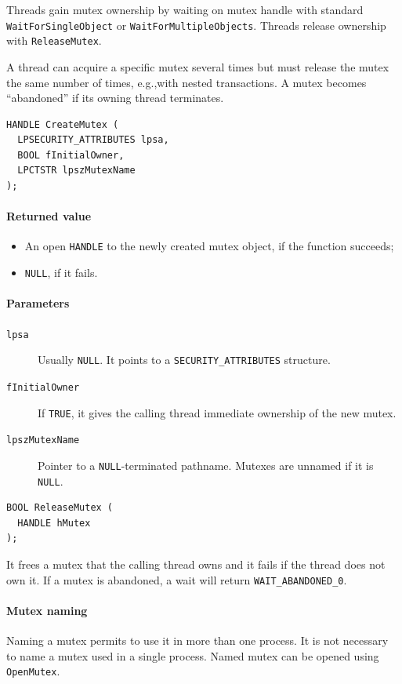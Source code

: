 Threads gain mutex ownership by waiting on mutex handle with standard \texttt{WaitForSingleObject} or \texttt{WaitForMultipleObjects}. Threads release ownership with \texttt{ReleaseMutex}.

A thread can acquire a specific mutex several times but must release the mutex the same number of times, e.g.,\@ with nested transactions. A mutex becomes ``abandoned'' if its owning thread terminates.

\begin{verbatim}
HANDLE CreateMutex (
  LPSECURITY_ATTRIBUTES lpsa,
  BOOL fInitialOwner,
  LPCTSTR lpszMutexName
);
\end{verbatim}

\paragraph{Returned value}
\begin{itemize}
\item An open \texttt{HANDLE} to the newly created mutex object, if the function succeeds;
\item \texttt{NULL}, if it fails.
\end{itemize}

\paragraph{Parameters}
\begin{description}
\item [\texttt{lpsa}] Usually \texttt{NULL}. It points to a \texttt{SECURITY\_ATTRIBUTES} structure.
\item [\texttt{fInitialOwner}] If \texttt{TRUE}, it gives the calling thread immediate ownership of the new mutex.
\item [\texttt{lpszMutexName}] Pointer to a \texttt{NULL}-terminated pathname. Mutexes are unnamed if it is \texttt{NULL}.
\end{description}

\begin{verbatim}
BOOL ReleaseMutex (
  HANDLE hMutex
);
\end{verbatim}

It frees a mutex that the calling thread owns and it fails if the thread does not own it. If a mutex is abandoned, a wait will return \texttt{WAIT\_ABANDONED\_0}.

\paragraph{Mutex naming}
Naming a mutex permits to use it in more than one process. It is not necessary to name a mutex used in a single process. Named mutex can be opened using \texttt{OpenMutex}.

